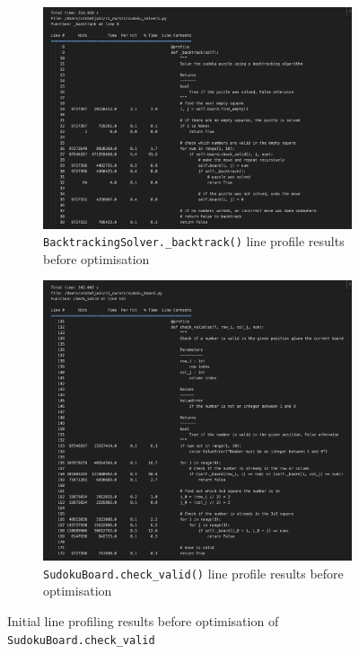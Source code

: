 \documentclass[11pt]{article}
\begin{document}
\begin{itemize}
\begin{figure}[H]
    \centering
    \begin{subfigure}[b]{0.8\textwidth}
        \includegraphics[width=\textwidth]{figs/bt_line_profile_before.png}
        \caption{\texttt{BacktrackingSolver.\_backtrack()} line profile results before optimisation}
        \label{fig:backtrack_before}
    \end{subfigure}
    \begin{subfigure}[b]{0.8\textwidth}
        \includegraphics[width=\textwidth]{figs/check_valid_before.png}
        \caption{\texttt{SudokuBoard.check\_valid()} line profile results before optimisation}
        \label{fig:check_valid_before}
    \end{subfigure}
    \caption{Initial line profiling results before optimisation of \texttt{SudokuBoard.check\_valid}}
    \label{fig:line_profiling_initial}
\end{figure}


\end{itemize}
\end{document}
